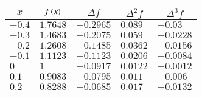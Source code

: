 \begin{tabular}{|l|l|l|l|l|}
\hline
\multicolumn{1}{|c|}{\textbf{$x$}}    
& \multicolumn{1}{|c|}{\textbf{$f\left(x\right)$}} 
&\multicolumn{1}{|c|}{\textbf{$\Delta{f}$}}
&\multicolumn{1}{|c|}{\textbf{$\Delta^2f$}}
&\multicolumn{1}{|c|}{\textbf{$\Delta^3f$}}\\
\hline
$-0.4$ & $1.7648$ &$-0.2965$ & $0.089$ & $-0.03$ \\
\hline
$-0.3$ & $1.4683$ & $-0.2075$ & $0.059$ & $-0.0228$ \\
\hline
$-0.2$ & $1.2608$ & $-0.1485$ & $0.0362$ & $-0.0156$ \\
\hline
$-0.1$ & $1.1123$ & $-0.1123$ & $0.0206$ & $-0.0084$ \\
\hline
$0$ & $1$ & $-0.0917$ & $0.0122$ & $-0.0012$ \\
\hline
$0.1$ & $0.9083$ & $-0.0795$ & $0.011$ & $-0.006$ \\
\hline
$0.2$ & $0.8288$ & $-0.0685$ & $0.017$ & $-0.0132$ \\
\hline
\end{tabular}
